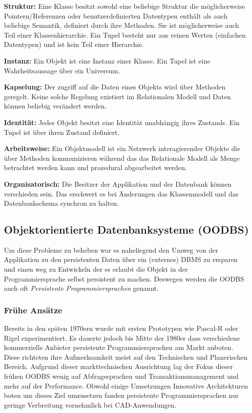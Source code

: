 \begin{description}
	\item \textbf{Struktur:} 
		Eine Klasse besitzt sowohl eine beliebige Struktur die möglicherweise Pointern/Referenzen oder benutzerdefinierten Datentypen enthält als auch beliebige Semantik, definiert durch ihre Methoden. Sie ist möglicherweise auch Teil einer Klassenhierarchie. Ein Tupel besteht nur aus reinen Werten (einfachen Datentypen) und ist kein Teil einer Hierarchie.
	
	\item \textbf{Instanz:}
		Ein Objekt ist eine Instanz einer Klasse. Ein Tupel ist eine Wahrheitsaussage über ein Universum.
	
	\item \textbf{Kapselung:} 
		Der zugriff auf die Daten eines Objekts wird über Methoden geregelt. Keine solche Regelung existiert im Relationalen Modell und Daten können beliebig verändert werden.
	
	\item \textbf{Identität:}
		Jedes Objekt besitzt eine Identität unabhängig ihres Zustands. Ein Tupel ist über ihren Zustand definiert. 
	
	\item \textbf{Arbeitsweise:}
		Ein Objektmodell ist ein Netzwerk interagierender Objekte die über Methoden kommunizieren während das das Relationale Modell als Menge betrachtet werden kann und prozedural abgearbeitet werden.
	
	\item \textbf{Organisatorisch:} 
		Die Besitzer der Applikation und der Datenbank können verschieden sein. Das erschwert es bei Änderungen das Klassenmodell und das Datenbankschema synchron zu halten. 
	
\end{description}


\subsection{Objektorientierte Datenbanksysteme (OODBS)}
Um diese Probleme zu beheben war es naheliegend den Umweg von der Applikation zu den persistenten Daten über ein (externes) DBMS zu ersparen und einen weg zu Entwickeln der es erlaubt die Objekt in der Programmiersprache selbst persistent zu machen. Deswegen werden die OODBS auch oft \emph{Persistente Programmiersprachen} genannt.

\subsubsection{Frühe Ansätze}
Bereits in den späten 1970ern wurde mit ersten Prototypen wie Pascal-R oder Rigel experimentiert. Es dauerte jedoch bis Mitte der 1980er dass verschiedene kommerzielle Anbieter persistente Programmiersprachen am Markt anboten. Diese richteten ihre Aufmerksamkeit meist auf den Technischen und Planerischen Bereich. Aufgrund dieser markttechnischen Ausrichtung lag der Fokus dieser frühen OODBS wenig auf Abfragesprachen und Transaktionsmanagement und mehr auf der Performance. Obwohl einige Umsetzungen Innovative Architekturen boten um dieses Ziel umzusetzen fanden persistente Programmiersprachen nur geringe Verbreitung vornehmlich bei CAD-Anwendungen.

